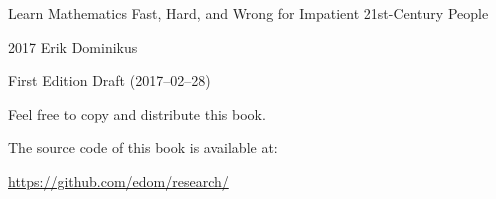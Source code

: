 {
    \setlength\parindent{0em}
    Learn Mathematics Fast, Hard, and Wrong for Impatient 21st-Century People\par\vspace{1em}
    \textcopyright{} 2017 Erik Dominikus\par\vspace{1em}
    First Edition Draft (2017--02--28)\par\vspace{1em}
    Feel free to copy and distribute this book.\par\vspace{1em}
    The source code of this book is available at:\par\vspace{1em}
    \url{https://github.com/edom/research/}\par
}
